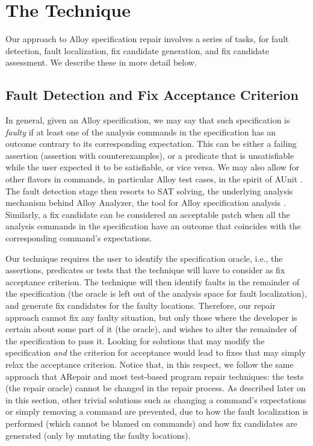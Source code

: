 \section{The Technique}

Our approach to Alloy specification repair involves a series of tasks, for fault detection, fault localization, fix candidate generation, and fix candidate assessment. We describe these in more detail below. 

\subsection{Fault Detection and Fix Acceptance Criterion}

In general, given an Alloy specification, we may say that such specification is \emph{faulty} if at least one of the analysis commands in the specification has an outcome contrary to its corresponding expectation. This can be either a failing assertion (assertion with counterexamples), or a predicate that is unsatisfiable while the user expected it to be satisfiable, or vice versa. We may also allow for other flavors in commands, in particular Alloy test cases, in the spirit of AUnit \cite{Sullivan+2018}. The fault detection stage then resorts to SAT solving, the underlying analysis mechanism behind Alloy Analyzer, the tool for Alloy specification analysis \cite{Jackson2006}. Similarly, a fix candidate can be considered an acceptable patch when all the analysis commands in the specification have an outcome that coincides with the corresponding command's expectations. 

Our technique requires the user to identify the specification oracle, i.e., the assertions, predicates or tests that the technique will have to consider as fix acceptance criterion. The technique will then identify faults in the remainder of the specification (the oracle is left out of the analysis space for fault localization), and generate fix candidates for the faulty locations. Therefore, our repair approach cannot fix any faulty situation, but only those where the developer is certain about some part of it (the oracle), and wishes to alter the remainder of the specification to pass it. Looking for solutions that may modify the specification \emph{and} the criterion for acceptance would lead to fixes that may simply relax the acceptance criterion. Notice that, in this respect, we follow the same approach that ARepair and most test-based program repair techniques: the tests (the repair oracle) cannot be changed in the repair process. As described later on in this section, other trivial solutions such as changing a command's expectations or simply removing a command are prevented, due to how the fault localization is performed (which cannot be blamed on commands) and how fix candidates are generated (only by mutating the faulty locations). 

